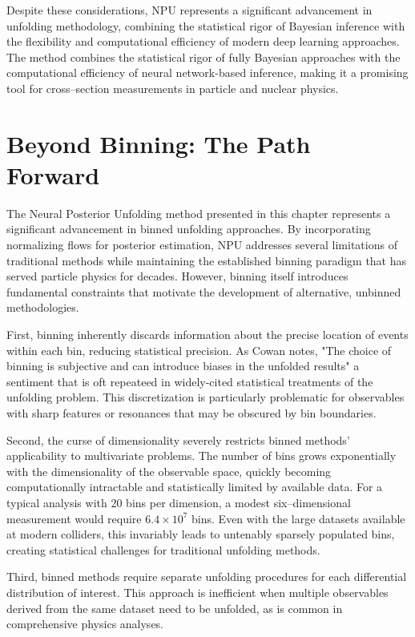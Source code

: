     Despite these considerations, NPU represents a significant advancement in unfolding methodology, combining the statistical rigor of Bayesian inference with the flexibility and computational efficiency of modern deep learning approaches.
    The method combines the statistical rigor of fully Bayesian approaches with the computational efficiency of neural network-based inference, making it a promising tool for cross--section measurements in particle and nuclear physics.

\section{Beyond Binning: The Path Forward}
    The Neural Posterior Unfolding method presented in this chapter represents a significant advancement in binned unfolding approaches.
    By incorporating normalizing flows for posterior estimation, NPU addresses several limitations of traditional methods while maintaining the established binning paradigm that has served particle physics for decades.
    However, binning itself introduces fundamental constraints that motivate the development of alternative, unbinned methodologies.

    First, binning inherently discards information about the precise location of events within each bin, reducing statistical precision.
    As Cowan notes, "The choice of binning is subjective and can introduce biases in the unfolded results" a sentiment that is oft repeateed in widely-cited statistical treatments of the unfolding problem.
    This discretization is particularly problematic for observables with sharp features or resonances that may be obscured by bin boundaries.

    Second, the curse of dimensionality severely restricts binned methods' applicability to multivariate problems.
    The number of bins grows exponentially with the dimensionality of the observable space, quickly becoming computationally intractable and statistically limited by available data.
    For a typical analysis with 20 bins per dimension, a modest six--dimensional measurement would require \(6.4\times10^7\) bins.
    Even with the large datasets available at modern colliders, this invariably leads to untenably sparsely populated bins, creating statistical challenges for traditional unfolding methods.

    Third, binned methods require separate unfolding procedures for each differential distribution of interest.
    This approach is inefficient when multiple observables derived from the same dataset need to be unfolded, as is common in comprehensive physics analyses.
    
